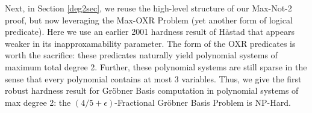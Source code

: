 \documentclass{article}
\begin{document}
Next, in Section \ref{deg2sec}, we reuse the high-level structure of our Max-Not-2 proof, but now leveraging the Max-OXR Problem (yet another form of logical predicate). Here we use an earlier 2001 hardness result of H{\aa}stad that appears weaker in its inapproxamability parameter. The form of the OXR predicates is worth the sacrifice: these predicates naturally yield polynomial systems of maximum total degree 2. Further, these polynomial systems are still sparse in the sense that every polynomial contains at most 3 variables. Thus, we give the first robust hardness result for Gr\"{o}bner Basis computation in polynomial systems of max degree 2: the $(4/5+\epsilon)$-Fractional Gr\"{o}bner Basis Problem is NP-Hard. 
\end{document}
